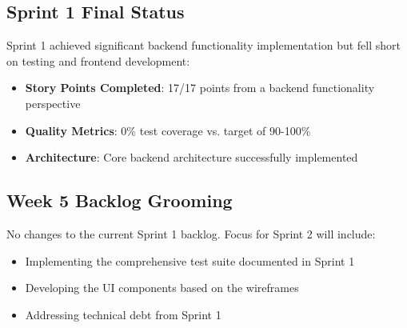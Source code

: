 \documentclass[12pt]{article}
\begin{document}
\subsection{Sprint 1 Final Status}
Sprint 1 achieved significant backend functionality implementation but fell short on testing and frontend development:

\begin{itemize}
  \item \textbf{Story Points Completed}: 17/17 points from a backend functionality perspective
  \item \textbf{Quality Metrics}: 0\% test coverage vs. target of 90-100\%
  \item \textbf{Architecture}: Core backend architecture successfully implemented
\end{itemize}

\subsection{Week 5 Backlog Grooming}
No changes to the current Sprint 1 backlog. Focus for Sprint 2 will include:
\begin{itemize}
  \item Implementing the comprehensive test suite documented in Sprint 1
  \item Developing the UI components based on the wireframes
  \item Addressing technical debt from Sprint 1
\end{itemize}
\end{document}
